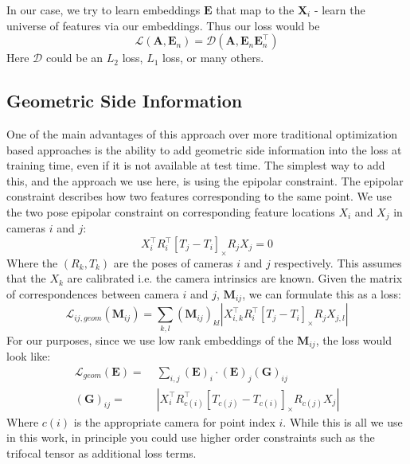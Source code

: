 \documentclass[10pt,twocolumn,letterpaper]{article}
\newcommand{\mat}[1]{\mathbf{#1}}
\newcommand{\cross}[1]{[#1]_{\times}}
\begin{document}
In our case, we try to learn embeddings $\mat{E}$ that map to the $\mat{X}_i$ - learn the universe of features via our embeddings.
Thus our loss would be 
\begin{equation}
\mathcal{L}(\mat{A}, \mat{E}_n) = \mathcal{D}(\mat{A}, \mat{E}_n\mat{E}_n^\top)
\end{equation}
Here $\mathcal{D}$ could be an $L_2$ loss, $L_1$ loss, or many others. 

\subsection{Geometric Side Information}
One of the main advantages of this approach over more traditional optimization based approaches is the ability to add geometric side information into the loss at training time, even if it is not available at test time.
The simplest way to add this, and the approach we use here, is using the epipolar constraint.
The epipolar constraint describes how two features corresponding to the same point.
We use the two pose epipolar constraint \cite{tron2014quotient} on corresponding feature locations $X_i$ and $X_j$ in cameras $i$ and $j$:
\begin{equation}
X_{i}^\top R_{i}^\top \cross{T_{j} - T_{i}}R_{j} X_{j} = 0
\label{eq:essential_constraint}
\end{equation}
Where the $(R_k, T_k)$ are the poses of cameras $i$ and $j$ respectively.
This assumes that the $X_k$ are calibrated i.e. the camera intrinsics are known. 
Given the matrix of correspondences between camera $i$ and $j$, $\mat{M}_{ij}$, we can formulate this as a loss:
\begin{equation}
\mathcal{L}_{ij,geom}(\mat{M}_{ij}) = \sum_{k,l} (\mat{M}_{ij})_{kl} \left|X_{i,k}^\top R_{i}^\top \cross{T_{j} - T_{i}}R_{j} X_{j,l}\right|
\label{eq:geom_cost}
\end{equation}
For our purposes, since we use low rank embeddings of the $\mat{M}_{ij}$, the loss would look like:
\begin{align}
\mathcal{L}_{geom}(\mat{E}) =&\; \sum_{i,j} (\mat{E})_{i} \cdot (\mat{E})_{j} (\mat{G})_{ij} \\
(\mat{G})_{ij} =&\; \left|X_{i}^\top R_{c(i)}^\top \cross{T_{c(j)} - T_{c(i)}}R_{c(j)} X_{j}\right| \nonumber
\label{eq:geom_cost2}
\end{align}
Where $c(i)$ is the appropriate camera for point index $i$.
While this is all we use in this work, in principle you could use higher order constraints such as the trifocal tensor as additional loss terms.
\end{document}

